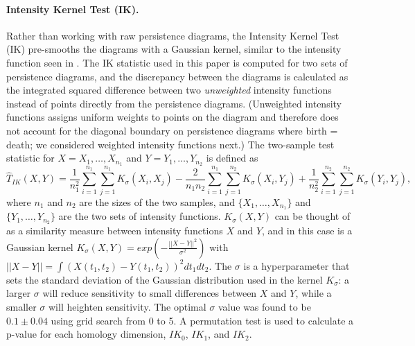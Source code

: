 \documentclass[12pt]{article}
\begin{document}
\paragraph{Intensity Kernel Test (IK).}
Rather than working with raw persistence diagrams, the Intensity Kernel Test (IK) pre-smooths the diagrams with a Gaussian kernel, similar to the intensity function seen in \citep{chen2015statistical}. The IK statistic used in this paper is computed for two sets of persistence diagrams, and the discrepancy between the diagrams is calculated as the integrated squared difference between two \emph{unweighted} intensity functions instead of points directly from the persistence diagrams. (Unweighted intensity functions assigns uniform weights to points on the diagram and therefore does not account for the diagonal boundary on persistence diagrams where birth = death; we considered weighted intensity functions next.) The two-sample test statistic for $X = X_1, \ldots, X_{n_1}$ and $Y = Y_1, \ldots, Y_{n_2}$ is defined as
%
\begin{equation}
\widehat{T}_{IK}(X, Y) = \frac{1}{n_1^{2}}\sum_{i=1}^{n_1}\sum_{j=1}^{n_1} K_{\sigma}(X_{i}, X_{j}) - \frac{2}{n_1n_2}\sum_{i=1}^{n_1}\sum_{j=1}^{n_2}K_{\sigma}(X_{i}, Y_{j}) + \frac{1}{n_2^{2}}\sum_{i=1}^{n_2}\sum_{j=1}^{n_2} K_{\sigma}(Y_{i}, Y_{j}), \label{eq:kernel_test}
\end{equation} where $n_1$ and $n_2$ are the sizes of the two samples, and $\{X_1, \ldots, X_{n_1}\}$ and $\{Y_1, \ldots, Y_{n_2}\}$ are the two sets of intensity functions.  $K_{\sigma}(X,Y)$ can be thought of as a similarity measure between intensity functions $X$ and $Y$, and in this case is a Gaussian kernel $K_{\sigma}(X,Y) = exp(-\frac{||X - Y||^{2}}{\sigma^{2}})$ with  $||X - Y|| = \int \left(X(t_1, t_2) - Y(t_1, t_2)\right)^2dt_1dt_2$. The $\sigma$ is a hyperparameter that sets the standard deviation of the Gaussian distribution used in the kernel $K_{\sigma}$: a larger $\sigma$ will reduce sensitivity to small differences between $X$ and $Y$, while a smaller $\sigma$ will heighten sensitivity. The optimal $\sigma$ value was found to be $0.1 \pm 0.04$ using grid search from 0 to 5. A permutation test is used to calculate a p-value for each homology dimension, $IK_0$, $IK_1$, and $IK_2$.

\end{document}
